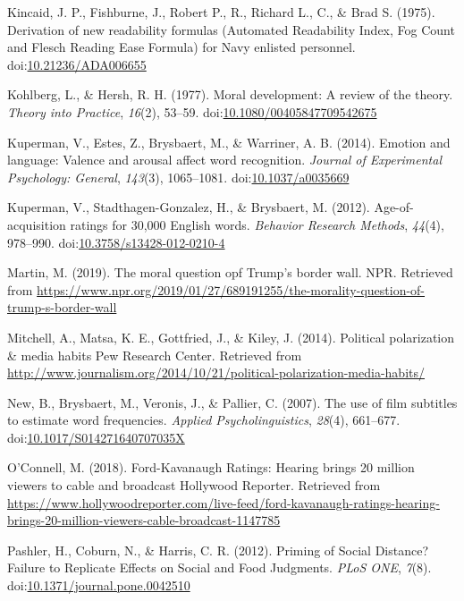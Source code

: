 \documentclass[english,,man]{apa6}
\begin{document}
\hypertarget{ref-Kincaid1975}{}
Kincaid, J. P., Fishburne, J., Robert P., R., Richard L., C., \& Brad S.
(1975). Derivation of new readability formulas (Automated Readability
Index, Fog Count and Flesch Reading Ease Formula) for Navy enlisted
personnel.
doi:\href{https://doi.org/10.21236/ADA006655}{10.21236/ADA006655}

\hypertarget{ref-Kohlberg1977}{}
Kohlberg, L., \& Hersh, R. H. (1977). Moral development: A review of the
theory. \emph{Theory into Practice}, \emph{16}(2), 53--59.
doi:\href{https://doi.org/10.1080/00405847709542675}{10.1080/00405847709542675}

\hypertarget{ref-Kuperman2014}{}
Kuperman, V., Estes, Z., Brysbaert, M., \& Warriner, A. B. (2014).
Emotion and language: Valence and arousal affect word recognition.
\emph{Journal of Experimental Psychology: General}, \emph{143}(3),
1065--1081.
doi:\href{https://doi.org/10.1037/a0035669}{10.1037/a0035669}

\hypertarget{ref-Kuperman2012}{}
Kuperman, V., Stadthagen-Gonzalez, H., \& Brysbaert, M. (2012).
Age-of-acquisition ratings for 30,000 English words. \emph{Behavior
Research Methods}, \emph{44}(4), 978--990.
doi:\href{https://doi.org/10.3758/s13428-012-0210-4}{10.3758/s13428-012-0210-4}

\hypertarget{ref-Martin2019}{}
Martin, M. (2019). The moral question opf Trump's border wall. NPR.
Retrieved from
\url{https://www.npr.org/2019/01/27/689191255/the-morality-question-of-trump-s-border-wall}

\hypertarget{ref-Mitchell2014}{}
Mitchell, A., Matsa, K. E., Gottfried, J., \& Kiley, J. (2014).
Political polarization \& media habits \textbar{} Pew Research Center.
Retrieved from
\url{http://www.journalism.org/2014/10/21/political-polarization-media-habits/}

\hypertarget{ref-New2007}{}
New, B., Brysbaert, M., Veronis, J., \& Pallier, C. (2007). The use of
film subtitles to estimate word frequencies. \emph{Applied
Psycholinguistics}, \emph{28}(4), 661--677.
doi:\href{https://doi.org/10.1017/S014271640707035X}{10.1017/S014271640707035X}

\hypertarget{ref-OConnell2018}{}
O'Connell, M. (2018). Ford-Kavanaugh Ratings: Hearing brings 20 million
viewers to cable and broadcast \textbar{} Hollywood Reporter. Retrieved
from
\url{https://www.hollywoodreporter.com/live-feed/ford-kavanaugh-ratings-hearing-brings-20-million-viewers-cable-broadcast-1147785}

\hypertarget{ref-Pashler2012}{}
Pashler, H., Coburn, N., \& Harris, C. R. (2012). Priming of Social
Distance? Failure to Replicate Effects on Social and Food Judgments.
\emph{PLoS ONE}, \emph{7}(8).
doi:\href{https://doi.org/10.1371/journal.pone.0042510}{10.1371/journal.pone.0042510}
\end{document}
